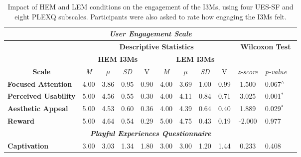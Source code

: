 \begin{table*}[b!]
\caption{Impact of HEM and LEM conditions on the engagement of the I3Ms, using four UES-SF and eight PLEXQ subscales. Participants were also asked to rate how engaging the I3Ms felt.}
\label{table:4}
\begin{tabular}{@{}cccccccccccclll@{}}
\toprule
\multicolumn{15}{c}{\textit{\textbf{User Engagement Scale}}} \\ \midrule
\multicolumn{1}{c|}{\multirow{2}{*}{}} &
  \multicolumn{8}{c|}{\textbf{Descriptive Statistics}} &
  \multicolumn{6}{c}{\textbf{Wilcoxon Test}} \\
\multicolumn{1}{c|}{} &
  \multicolumn{4}{c|}{\textbf{HEM I3Ms}} &
  \multicolumn{4}{c|}{\textbf{LEM I3Ms}} &
  \multicolumn{6}{c}{\textbf{}} \\
\multicolumn{1}{c|}{\textbf{Scale}} &
  \textit{M} &
  $\mu$ &
  \textit{SD} &
  \multicolumn{1}{c|}{V} &
  \textit{M} &
  $\mu$ &
  \textit{SD} &
  \multicolumn{1}{c|}{V} &
  \textit{z-score} &
  \textit{p-value} &
  \multicolumn{4}{c}{} \\ \midrule
\multicolumn{1}{l|}{\textbf{Focused Attention}} &
  4.00 &
  3.86 &
  0.95 &
  \multicolumn{1}{c|}{0.90} &
  4.00 &
  3.69 &
  1.00 &
  \multicolumn{1}{c|}{0.99} &
  1.500 &
  \multicolumn{1}{l}{0.067$^\wedge$} &
  \multicolumn{4}{c}{} \\
\multicolumn{1}{l|}{\textbf{Perceived Usability}} &
  5.00 &
  4.56 &
  0.55 &
  \multicolumn{1}{c|}{0.30} &
  4.00 &
  4.11 &
  0.84 &
  \multicolumn{1}{c|}{0.71} &
  3.025 &
  \multicolumn{1}{l}{0.001$^\ast$} &
  \multicolumn{4}{c}{} \\
\multicolumn{1}{l|}{\textbf{Aesthetic Appeal}} &
  5.00 &
  4.53 &
  0.60 &
  \multicolumn{1}{c|}{0.36} &
  4.00 &
  4.39 &
  0.64 &
  \multicolumn{1}{c|}{0.40} &
  1.889 &
  \multicolumn{1}{l}{0.029$^\ast$} &
  \multicolumn{4}{c}{} \\
\multicolumn{1}{l|}{\textbf{Reward}} &
  5.00 &
  4.64 &
  0.54 &
  \multicolumn{1}{c|}{0.29} &
  5.00 &
  4.75 &
  0.43 &
  \multicolumn{1}{c|}{0.19} &
  -2.000 &
  \multicolumn{1}{l}{0.977} &
  \multicolumn{4}{c}{} \\ \midrule
\multicolumn{15}{c}{\textit{\textbf{Playful Experiences Questionnaire}}} \\ \midrule
\multicolumn{1}{l|}{\textbf{Captivation}} &
  3.00 &
  3.03 &
  1.34 &
  \multicolumn{1}{c|}{1.80} &
  3.00 &
  3.00 &
  1.20 &
  \multicolumn{1}{c|}{1.44} &
  0.233 &
  \multicolumn{1}{l}{0.408} &
  \multicolumn{4}{c}{} \\

\end{tabular}
\end{table*}

